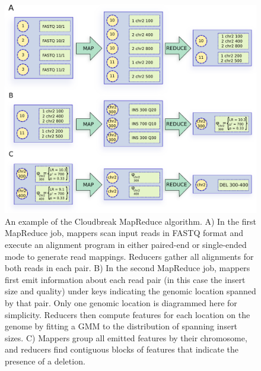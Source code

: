 \documentclass[11pt]{article}
\begin{document}
\clearpage

\begin{figure}[h]
\centering
\includegraphics[width=1\textwidth]{cloudbreak_mapred_diagram.pdf}
\caption{An example of the Cloudbreak MapReduce algorithm. A) In the first MapReduce job, mappers scan input reads in FASTQ format and execute an alignment program in either paired-end or single-ended mode to generate read mappings. Reducers gather all alignments for both reads in each pair. B) In the second MapReduce job, mappers first emit information about each read pair (in this case the insert size and quality) under keys indicating the genomic location spanned by that pair. Only one genomic location is diagrammed here for simplicity. Reducers then compute features for each location on the genome by fitting a GMM to the distribution of spanning insert sizes. C) Mappers group all emitted features by their chromosome, and reducers find contiguous blocks of features that indicate the presence of a deletion.}
\label{algorithm_example}
\end{figure}

\clearpage
\end{document}
